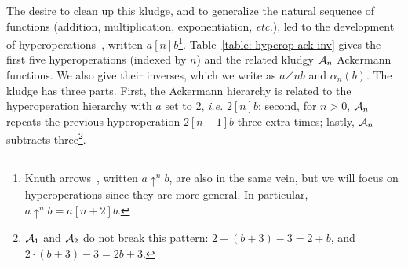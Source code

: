 The desire to clean up this kludge, and to generalize the natural sequence
of functions (addition, multiplication, exponentiation, \emph{etc.}),
led to the development of hyperoperations~\cite{goodstein},
written $a [n] b$\footnote{Knuth arrows~\cite{knuth}, written $a \uparrow^n b$,
are also in the same vein, but we will focus on hyperoperations
since they are more general. In particular, $a \uparrow^n b = a[n+2]b$.}.
Table~\ref{table: hyperop-ack-inv} gives the first five hyperoperations
(indexed by $n$) and the related kludgy $\mathcal{A}_n$ Ackermann functions.
We also give their inverses,
which we write as $a \angle{n} b$ and $\alpha_n(b)$.
The kludge has three parts. First, the Ackermann hierarchy is related
to the hyperoperation hierarchy with $a$ set to $2$, \emph{i.e.} $2[n]b$;
second, for $n>0$, $\mathcal{A}_n$ repeats the previous hyperoperation $2[n-1]b$
three extra times;
lastly, $\mathcal{A}_n$ subtracts three\footnote{$\mathcal{A}_{1}$ and $\mathcal{A}_{2}$ do not break this pattern: $2 + (b + 3) - 3 = 2 + b$, and $2 \cdot (b + 3) - 3 = 2b + 3$.}.


